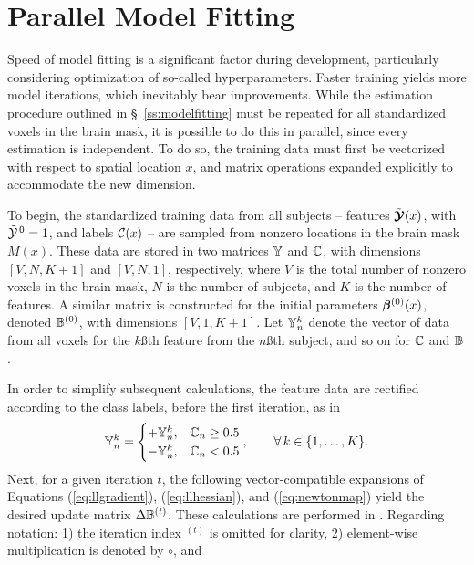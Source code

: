 \section{Parallel Model Fitting}\label{s:parallelfit}
Speed of model fitting is a significant factor during development, particularly considering optimization of so-called hyperparameters. Faster training yields more model iterations, which inevitably bear improvements. While the estimation procedure outlined in \S\ \ref{ss:modelfitting} must be repeated for all standardized voxels in the brain mask, it is possible to do this in parallel, since every estimation is independent. To do so, the training data must first be vectorized with respect to spatial location $x$, and matrix operations expanded explicitly to accommodate the new dimension.
\par
To begin, the standardized training data from all subjects -- features $\tilde{\bm{\mathcal{Y}}}(x)$, with $\tilde{\mathcal{Y}}^{\thinspace0}=1$, and labels $\mathcal{C}(x)$ -- are sampled from nonzero locations in the brain mask $M(x)$. These data are stored in two matrices $\mathbb{Y}$ and $\mathbb{C}$, with dimensions $[V,N,K+1]$ and $[V,N,1]$, respectively, where $V$ is the total number of nonzero voxels in the brain mask, $N$ is the number of subjects, and $K$ is the number of features. A similar matrix is constructed for the initial parameters $\bm{\beta}^{(0)}(x)$, denoted $\mathbb{B}^{(0)}$, with dimensions $[V,1,K+1]$. Let $\mathbb{Y}_n^k$ denote the vector of data from all voxels for the $k$\ss{th} feature from the $n$\ss{th} subject, and so on for $\mathbb{C}$ and $\mathbb{B}$.
\par
In order to simplify subsequent calculations, the feature data are rectified according to the class labels, before the first iteration, as in
\begin{equation}
\mathbb{Y}_n^k =
\begin{cases}
+\mathbb{Y}_n^k, & \mathbb{C}_n \ge 0.5\\
-\mathbb{Y}_n^k, & \mathbb{C}_n <  0.5\\
\end{cases},\qquad\forall\thinspace k \in \{1,\dots,K\}.
\end{equation}
Next, for a given iteration $t$, the following vector-compatible expansions of Equations (\ref{eq:llgradient}), (\ref{eq:llhessian}), and (\ref{eq:newtonmap}) yield the desired update matrix $\Delta\mathbb{B}^{(t)}$. These calculations are performed in .
Regarding notation:
1) the iteration index ${}^{(t)}$ is omitted for clarity,
2) element-wise multiplication is denoted by $\circ$, and
